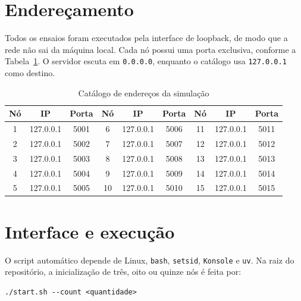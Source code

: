 \section{Endereçamento}

Todos os ensaios foram executados pela interface de loopback, de modo que a
rede não sai da máquina local. Cada nó possui uma porta exclusiva, conforme a
Tabela~\ref{tab:enderecos}. O servidor escuta em \texttt{0.0.0.0}, enquanto o
catálogo usa \texttt{127.0.0.1} como destino.

\begin{table}[H]
    \centering
    \caption{Catálogo de endereços da simulação}
    \label{tab:enderecos}
    \setlength{\tabcolsep}{3pt}
    \small
    \begin{tabular}{ccc@{\hspace{0.6cm}}ccc@{\hspace{0.6cm}}ccc}
        \toprule
        \textbf{Nó} & \textbf{IP} & \textbf{Porta} &
        \textbf{Nó} & \textbf{IP} & \textbf{Porta} &
        \textbf{Nó} & \textbf{IP} & \textbf{Porta}                                                 \\
        \midrule
        1           & 127.0.0.1   & 5001           & 6  & 127.0.0.1 & 5006 & 11 & 127.0.0.1 & 5011 \\
        2           & 127.0.0.1   & 5002           & 7  & 127.0.0.1 & 5007 & 12 & 127.0.0.1 & 5012 \\
        3           & 127.0.0.1   & 5003           & 8  & 127.0.0.1 & 5008 & 13 & 127.0.0.1 & 5013 \\
        4           & 127.0.0.1   & 5004           & 9  & 127.0.0.1 & 5009 & 14 & 127.0.0.1 & 5014 \\
        5           & 127.0.0.1   & 5005           & 10 & 127.0.0.1 & 5010 & 15 & 127.0.0.1 & 5015 \\
        \bottomrule
    \end{tabular}
\end{table}

\section{Interface e execução}

O script automático depende de Linux, \texttt{bash}, \texttt{setsid},
\texttt{Konsole} e \texttt{uv}. Na raiz do repositório, a inicialização de
três, oito ou quinze nós é feita por:

\begin{lstlisting}[style=bash, numbers=none]
./start.sh --count <quantidade>
\end{lstlisting}

